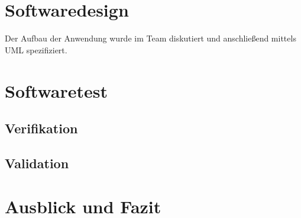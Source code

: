 
\section{Softwaredesign}

Der Aufbau der Anwendung wurde im Team diskutiert und anschließend mittels UML spezifiziert.


\section{Softwaretest}

\subsection{Verifikation}

\subsection{Validation}

\section{Ausblick und Fazit}

%




